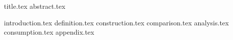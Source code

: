 \documentclass[11pt]{llncs}
\begin{document}
{title.tex}
\thispagestyle{plain}
{abstract.tex}

{introduction.tex}
{definition.tex}
{construction.tex}
{comparison.tex}
{analysis.tex}
{consumption.tex}
\newpage
\appendix
{appendix.tex}



\end{document}
